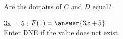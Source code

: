 \documentclass{ximera}
\begin{document}
\begin{exercise}
Are the domains of $C$ and $D$ equal?

\begin{multipleChoice}
\end{multipleChoice}

\end{exercise}





\begin{exercise}

3x + 5 :  $F(1) = \answer{3x + 5}$ \\
Enter DNE if the value does not exist.

\end{exercise}
\end{document}
